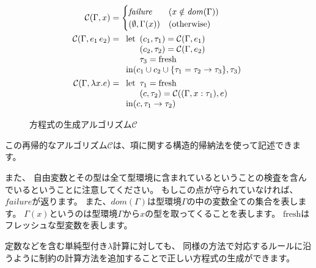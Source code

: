 \begin{figure}[htbp]
  \begin{align*}
    \mathcal{C}(\Gamma, x) &=
    \begin{cases}
      \mathit{failure}       & (x \notin \mathit{dom}(\Gamma)) \\
      (\emptyset, \Gamma(x)) & (\text{otherwise}) \\
    \end{cases} \\
    \mathcal{C}(\Gamma, e_1 \, e_2) &=
    \begin{array}[t]{l}
      \mathrm{let}
        \begin{array}[t]{l}
          (c_1, \tau_1) = \mathcal{C}(\Gamma, e_1) \\
          (c_2, \tau_2) = \mathcal{C}(\Gamma, e_2) \\
          \tau_3 = \mathrm{fresh}
        \end{array} \\
      \mathrm{in} (c_1 \cup c_2 \cup \{\tau_1 = \tau_2 \to \tau_3\}, \tau_3)
    \end{array} \\
    \mathcal{C}(\Gamma, \lambda x . e) &=
    \begin{array}[t]{l}
      \mathrm{let}
        \begin{array}[t]{l}
          \tau_1 = \mathrm{fresh} \\
          (c, \tau_2) = \mathcal{C}((\Gamma, x : \tau_1), e)
        \end{array} \\
      \mathrm{in} (c, \tau_1 \to \tau_2)
    \end{array}
  \end{align*}
  \caption{方程式の生成アルゴリズム$\mathcal C$}
  \label{fig:algorithm-c}
\end{figure}

この再帰的なアルゴリズム$\mathcal C$は、項に関する構造的帰納法を使って記述できます。

また、
自由変数とその型は全て型環境に含まれているということの検査を含んでいるということに注意してください。
もしこの点が守られていなければ、$\mathit{failure}$が返ります。
また、$\mathit{dom}(\Gamma)$は型環境$\Gamma$の中の変数全ての集合を表します。
$\Gamma(x)$というのは型環境$\Gamma$から$x$の型を取ってくることを表します。
$\mathrm{fresh}$はフレッシュな型変数を表します。

定数などを含む単純型付き$\lambda$計算に対しても、
同様の方法で対応するルールに沿うように制約の計算方法を追加することで正しい方程式の生成ができます。

